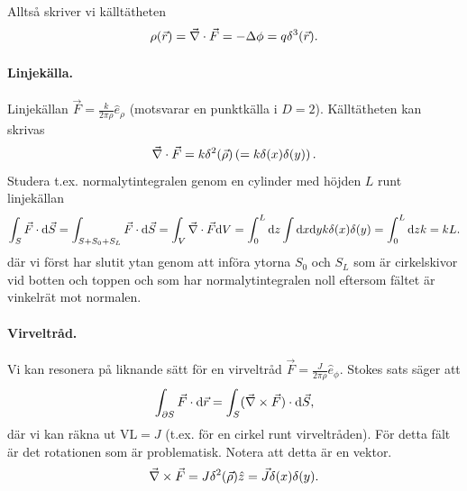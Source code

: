 \documentclass[%
oneside,                 %
final,                   %
10pt]{article}
\begin{document}
\noindent
Alltså skriver vi källtätheten 
$$
\rho(\vec{r}) = \vec{\nabla} \cdot \vec{F} = -\Delta \phi = q \delta^3(\vec{r}).
$$

\paragraph{Linjekälla.}
Linjekällan $\vec{F} = \frac{k}{2 \pi \rho} \hat{e}_\rho$ (motsvarar en punktkälla i $D=2$).
Källtätheten kan skrivas
$$
\vec{\nabla} \cdot \vec{F} = k \delta^2(\vec{\rho}) \left( = k \delta(x) \delta(y) \right).
$$
Studera t.ex. normalytintegralen genom en cylinder med höjden $L$ runt linjekällan
$$
\int_S \vec{F} \cdot \mbox{d}\vec{S} = \int_{S+S_0+S_L} \vec{F} \cdot \mbox{d}\vec{S} = \int_V \vec{\nabla} \cdot \vec{F} \mbox{d} V = \int_0^L \mbox{d} z \int \mbox{d}x \mbox{d}y k \delta(x)\delta(y) = \int_0^L \mbox{d} z k = k L.
$$
där vi först har slutit ytan genom att införa ytorna $S_0$ och $S_L$ som är cirkelskivor vid botten och toppen och som har normalytintegralen noll eftersom fältet är vinkelrät mot normalen.

\paragraph{Virveltråd.}
Vi kan resonera på liknande sätt för en virveltråd $\vec{F} = \frac{J}{2 \pi \rho} \hat{e}_\phi$. Stokes sats säger att
$$
\int_{\partial S} \vec{F} \cdot \mbox{d} \vec{r} = \int_S (\vec{\nabla} \times \vec{F}) \cdot \mbox{d} \vec{S},
$$
där vi kan räkna ut $\mathrm{VL} = J$ (t.ex. för en cirkel runt virveltråden). För detta fält är det rotationen som är problematisk. Notera att detta är en vektor.
$$
\vec{\nabla} \times \vec{F} = J \delta^2(\vec{\rho}) \hat{z} = \vec{J} \delta(x)\delta(y).
$$
\end{document}
